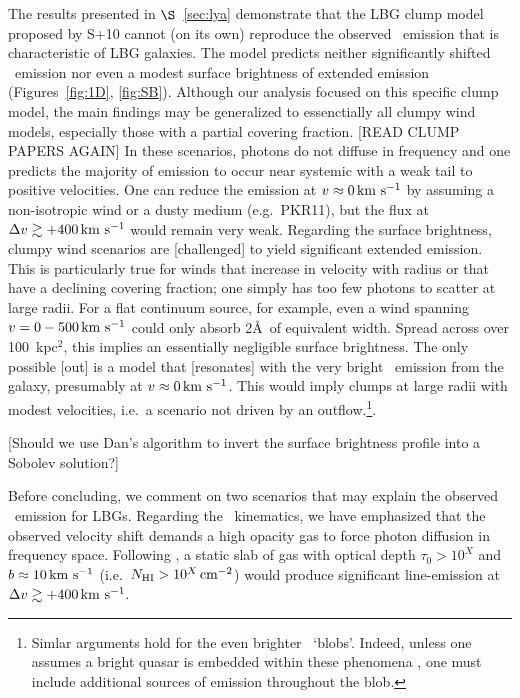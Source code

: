 \documentclass[12pt,preprint]{aastex}
\begin{document}
The results presented in $\S$~\ref{sec:lya} demonstrate that the LBG
clump model proposed by S+10 cannot (on its own) reproduce the
observed \lya\ emission that is characteristic of LBG galaxies.  The
model predicts neither significantly shifted \lya\ emission nor even a
modest surface brightness of extended emission (Figures~\ref{fig:1D},
\ref{fig:SB}).  Although our analysis focused on this specific clump
model, the main findings may be generalized to essenctially all clumpy
wind models, especially those with a partial covering fraction.  
[READ CLUMP PAPERS AGAIN]
In these scenarios, photons do not diffuse in frequency and one
predicts the majority of emission to occur near systemic with a weak
tail to positive velocities.  One can reduce the emission at $v
\approx 0 \, {\rm km~s^{-1}}$ by assuming a non-isotropic wind or a dusty medium 
(e.g.\ PKR11), but the flux at $\Delta v \gtrsim +400 \, {\rm km~s^{-1}}$ would
remain very weak. Regarding the surface brightness, clumpy wind scenarios 
are [challenged] to yield significant extended
emission. This is particularly true for winds that increase in
velocity with radius or that have a declining covering
fraction;  one simply has too few photons to scatter at large
radii.  For a flat continuum source, for example, even a wind spanning
$v = 0 - 500 \, {\rm km~s^{-1}}$ could only absorb 2\AA\ of equivalent width.  
Spread across over 100~kpc$^2$, this implies an essentially negligible
surface brightness.  The only possible [out] is a model that
[resonates] with the very bright \lya\ emission from the galaxy, 
presumably at $v \approx 0 \, {\rm km~s^{-1}}$.  This would imply clumps at large
radii with modest velocities, i.e.\ a scenario not driven by an
outflow.\footnote{Simlar arguments hold for the even brighter \lya\
  `blobs'.  Indeed, unless one assumes a bright quasar is embedded
  within these phenomena \citep{hpz+09}, one must include additional
 sources of emission throughout the blob.}.  

[Should we use Dan's algorithm to invert the surface brightness
profile into a Sobolev solution?]

Before concluding, we comment on two scenarios that may explain the
observed \lya\ emission for LBGs.  Regarding the \lya\ kinematics, we
have emphasized that the observed velocity shift demands a high
opacity gas to force photon diffusion in frequency space.  Following
\cite{neufeld91}, a static slab of gas with optical depth $\tau_0 >
10^X$ and $b \approx 10 \, {\rm km~s^{-1}}$ (i.e.\ $N_{\rm HI} > 10^{X} \, {\rm cm^{-2}}$) would
produce significant line-emission at $\Delta v \gtrsim +400 \, {\rm km~s^{-1}}$.  
\end{document}
